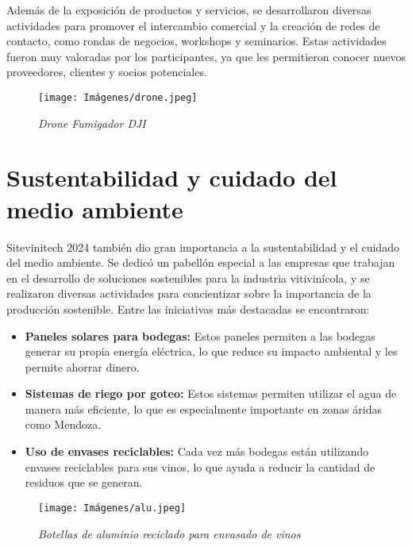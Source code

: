 Además de la exposición de productos y servicios, se desarrollaron diversas actividades para promover el intercambio comercial y la creación de redes de contacto, como rondas de negocios, workshops y seminarios. Estas actividades fueron muy valoradas por los participantes, ya que les permitieron conocer nuevos proveedores, clientes y socios potenciales.

\begin{figure}[h!]
    \centering
    \texttt{[image: Imágenes/drone.jpeg]}
    \caption{\textit{Drone Fumigador DJI}}
    \label{exemploLabel}
    \end{figure}

\section{Sustentabilidad y cuidado del medio ambiente}

Sitevinitech 2024 también dio gran importancia a la sustentabilidad y el cuidado del medio ambiente. Se dedicó un pabellón especial a las empresas que trabajan en el desarrollo de soluciones sostenibles para la industria vitivinícola, y se realizaron diversas actividades para concientizar sobre la importancia de la producción sostenible. Entre las iniciativas más destacadas se encontraron: 

    
\begin{itemize}
\item \textbf{Paneles solares para bodegas:} Estos paneles permiten a las bodegas generar su propia energía eléctrica, lo que reduce su impacto ambiental y les permite ahorrar dinero.
\item \textbf{Sistemas de riego por goteo:} Estos sistemas permiten utilizar el agua de manera más eficiente, lo que es especialmente importante en zonas áridas como Mendoza.
\item \textbf{Uso de envases reciclables:} Cada vez más bodegas están utilizando envases reciclables para sus vinos, lo que ayuda a reducir la cantidad de residuos que se generan.
\end{itemize}

\begin{figure}[h!]
    \centering
    \texttt{[image: Imágenes/alu.jpeg]}
    \caption{\textit{Botellas de aluminio reciclado para envasado de vinos}}
    \label{exemploLabel}
    \end{figure}
 
